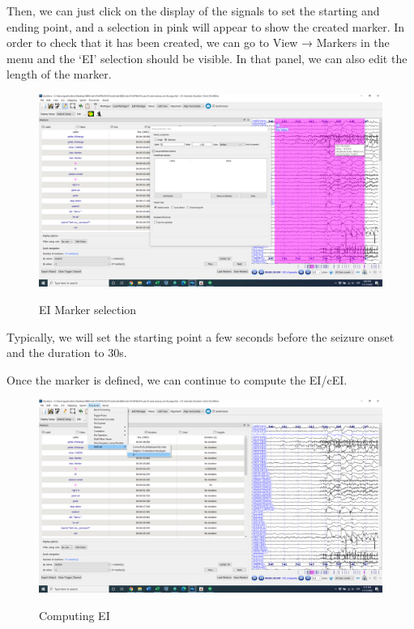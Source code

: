\documentclass[11pt,oneside]{amsart}
\begin{document}
Then, we can just click on the display of the signals to set the starting and ending point, and a selection in pink will appear to show the created marker. In order to check that it has been created, we can go to View → Markers in the menu and the ‘EI’ selection should be visible. In that panel, we can also edit the length of the marker.

\begin{figure}[H] \hspace{-0cm} \centering \hspace{0cm} \includegraphics[width=12cm,angle=0]{figures/marker_selection.png} \label{fig:4}
    \caption{EI Marker selection} 
\end{figure}

Typically, we will set the starting point a few seconds before the seizure onset and the duration to 30s.

Once the marker is defined, we can continue to compute the EI/cEI. 

\begin{figure}[H] \hspace{-0cm} \centering \hspace{0cm} \includegraphics[width=12cm,angle=0]{figures/EI_process.png} \label{fig:5}
    \caption{Computing EI} 
\end{figure}
\end{document}
